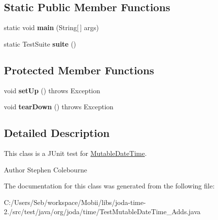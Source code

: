 \subsection*{Static Public Member Functions}
\begin{DoxyCompactItemize}
\item 
\hypertarget{classorg_1_1joda_1_1time_1_1_test_mutable_date_time___adds_ad0242ebbc1d47ab3f4fa8a082c4b5acd}{static void {\bfseries main} (String\mbox{[}$\,$\mbox{]} args)}\label{classorg_1_1joda_1_1time_1_1_test_mutable_date_time___adds_ad0242ebbc1d47ab3f4fa8a082c4b5acd}

\item 
\hypertarget{classorg_1_1joda_1_1time_1_1_test_mutable_date_time___adds_ab13b7fa9a04a8d36ee37b06df2f21394}{static Test\-Suite {\bfseries suite} ()}\label{classorg_1_1joda_1_1time_1_1_test_mutable_date_time___adds_ab13b7fa9a04a8d36ee37b06df2f21394}

\end{DoxyCompactItemize}
\subsection*{Protected Member Functions}
\begin{DoxyCompactItemize}
\item 
\hypertarget{classorg_1_1joda_1_1time_1_1_test_mutable_date_time___adds_a1b9819d23f918c9a47cfb345f29744c4}{void {\bfseries set\-Up} ()  throws Exception }\label{classorg_1_1joda_1_1time_1_1_test_mutable_date_time___adds_a1b9819d23f918c9a47cfb345f29744c4}

\item 
\hypertarget{classorg_1_1joda_1_1time_1_1_test_mutable_date_time___adds_ad5f568cfa1e7b9d906628b4b4d07633b}{void {\bfseries tear\-Down} ()  throws Exception }\label{classorg_1_1joda_1_1time_1_1_test_mutable_date_time___adds_ad5f568cfa1e7b9d906628b4b4d07633b}

\end{DoxyCompactItemize}


\subsection{Detailed Description}
This class is a J\-Unit test for \hyperlink{classorg_1_1joda_1_1time_1_1_mutable_date_time}{Mutable\-Date\-Time}.

\begin{DoxyAuthor}{Author}
Stephen Colebourne 
\end{DoxyAuthor}


The documentation for this class was generated from the following file\-:\begin{DoxyCompactItemize}
\item 
C\-:/\-Users/\-Seb/workspace/\-Mobii/libs/joda-\/time-\/2./src/test/java/org/joda/time/Test\-Mutable\-Date\-Time\-\_\-\-Adds.\-java\end{DoxyCompactItemize}
